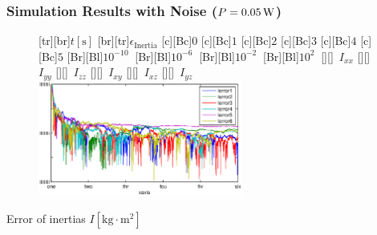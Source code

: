 \documentclass[student,noshadow]{ITRslides}
\newcommand{\scr}[1]{\mathrm{#1}}
\begin{document}
\begin{frame}
	\frametitle{Simulation Results with Noise ($P = \unit[0.05]{W}$)}
	\begin{center}
		\centering
		\begin{figure}
			[tr][br]{$t\left[\mathrm{s}\right]$}
			[br][tr]{$\epsilon_{\scr{Inertia}}$}
			[c][Bc]{$0$}
			[c][Bc]{$1$}
			[c][Bc]{$2$}
			[c][Bc]{$3$}
			[c][Bc]{$4$}
			[c][Bc]{$5$}
			[Br][Bl]{$10^{-10}\  $}
			[Br][Bl]{$10^{-6}\  $}
			[Br][Bl]{$10^{-2}\  $}
			[Br][Bl]{$10^2\  $}
			[][]{\tiny \  $I_{xx}$}
			[][]{\tiny \  $I_{yy}$}
			[][]{\tiny \  $I_{zz}$}
			[][]{\tiny \  $I_{xy}$}
			[][]{\tiny \  $I_{xz}$}
			[][]{\tiny \  $I_{yz}$}
			\includegraphics[width=0.6\textwidth]{fig/inertia_multi_noise.eps}
		\end{figure}
		\vspace{0.5cm}
		Error of inertias $I \left[\mathrm{kg} \cdot \mathrm{m}^2\right]$
	\end{center}
\end{frame}
\end{document}
